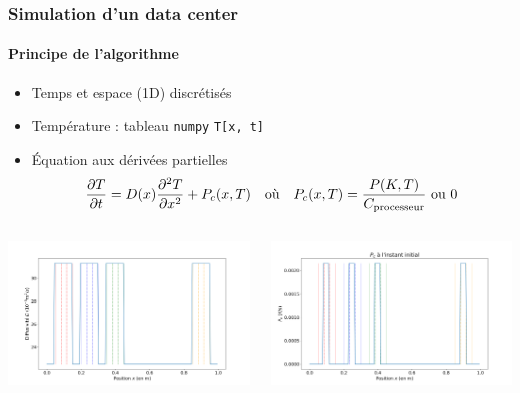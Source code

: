 \documentclass[a4paper,11pt]{beamer}
\newcommand{\p}{\texttt} %
\begin{document}
\begin{frame}[fragile]
    \frametitle{Simulation d'un data center}
    \framesubtitle{Principe de l'algorithme}

    \begin{itemize}
        \item Temps et espace (1D) discrétisés
        \item Température : tableau \p{numpy} \p{T[x, t]}
        \item Équation aux dérivées partielles
            $$\pdv{T}{t} = D(x) \pdv[2]{T}{x} + P_c(x, T) \quad \text{où} \quad P_c(x, T) = \frac{P(K, T)}{C_\text{processeur}}~\text{ou}~0$$
    \end{itemize}

    \begin{columns}
        \begin{column}{0.5\textwidth}
            \includegraphics[width=\textwidth]{diffusivite.png}
        \end{column}
        \begin{column}{0.5\textwidth}
            \includegraphics[width=\textwidth]{pc_initial.png}
        \end{column}
    \end{columns}
\end{frame}
\end{document}
